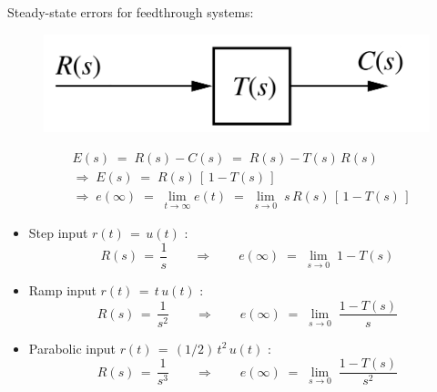 \documentclass[ 10pt, xcolor = dvipsnames]{beamer}
\begin{document}
\begin{frame}[allowframebreaks]
\frametitle{\insertsection}

Steady-state errors for feedthrough systems: 
\fullskip

\begin{figure}
\centering
\includegraphics[width=0.4\columnwidth]{figures/Nise_Fig-7-3a.jpg}
\end{figure}
\begin{align*}
& E(s) \; = \; R(s) - C(s) \; = \; R(s) - T(s) \, R(s) \\[1ex]
& \Longrightarrow \; E(s) \; = \; R(s) \, [ \, 1 - T(s) \, ] \\[1ex]
& \Longrightarrow \; e(\infty) \; = \; 
\lim_{ t \rightarrow \infty } e(t) \; = \; 
\lim_{ s \rightarrow 0 } \; s \, R(s) \, [ \, 1 - T(s) \, ]
\end{align*}
\framebreak

\begin{itemize}
\item Step input $r(t) \, = \, u(t)$ :
\[
R(s) \, = \, \frac{1}{s} \qquad \Longrightarrow \qquad
e(\infty) \; = \; 
\lim_{ s \rightarrow 0 } \; 1 - T(s)
\]
\item Ramp input $r(t) \, = \, t \, u(t)$ :
\[
R(s) \, = \, \frac{1}{s^2} \qquad \Longrightarrow \qquad
e(\infty) \; = \; 
\lim_{ s \rightarrow 0 } \; \frac{1 - T(s)}{s}
\]
\item Parabolic input $r(t) \, = \, (1/2) \, t^2 \, u(t)$ :
\[
R(s) \, = \, \frac{1}{s^3} \qquad \Longrightarrow \qquad
e(\infty) \; = \; 
\lim_{ s \rightarrow 0 } \; \frac{1 - T(s)}{s^2}
\]
\end{itemize}

\end{frame}
\end{document}
